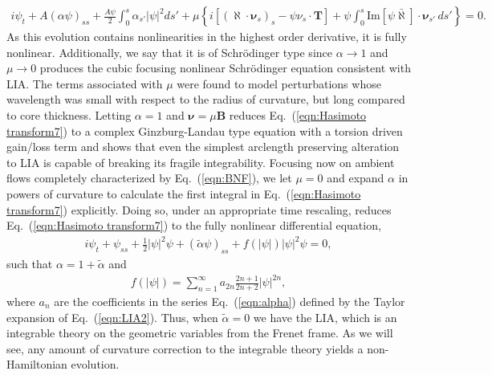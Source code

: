 \documentclass[aps,graphicx,reprint,onecolumn,12pt,tightenlines,longbibliography]{revtex4-1}
\newcommand{\sas}[2]{{#2}}
\begin{document}
%
\begin{align}
\label{eqn:Hasimoto transform7} i\psi_{t} + A(\alpha \psi)_{ss} +  \frac{A\psi}{2} \int_{0}^{s} \alpha_{s'}|\psi|^{2} ds'  + \mu \left\{ i[(\bm{\aleph}\cdot \bm{\nu}_{s})_{s}-\psi\nu_{s}\cdot {\textbf{T}}] +\psi \int_{0}^{s} \mbox{Im}[\psi \bar{\bm{\aleph}}] \cdot \bm{\nu}_{s'}\,ds'\right\}=0.
\end{align}
%
\sas{which is a fully nonlinear integro-differential equation of Schr\"odinger type.}{As this evolution contains nonlinearities in the highest order derivative, it is fully nonlinear. Additionally, we say that it is of Schr\"odinger type since $\alpha\to 1$ and $\mu \to 0$ produces the cubic focusing nonlinear Schr\"odinger equation consistent with LIA.} The terms associated with $\mu$ were found to model perturbations whose  wavelength was small with respect to the radius of curvature, but long compared to core thickness. Letting $\alpha=1$ and $\bm{\nu}=\mu \textbf{B}$ reduces Eq.~(\ref{eqn:Hasimoto transform7}) to a complex Ginzburg-Landau type equation with a torsion driven gain/loss term and shows that even the simplest arclength preserving alteration to LIA is capable of breaking its fragile integrability. Focusing now on ambient flows completely characterized by Eq.~(\ref{eqn:BNF}), we let $\mu=0$ and expand $\alpha$ in powers of curvature to calculate the first integral in Eq.~(\ref{eqn:Hasimoto transform7}) explicitly. Doing so, under an appropriate time rescaling, reduces Eq.~(\ref{eqn:Hasimoto transform7}) to the fully nonlinear differential equation,
%
\begin{align}\label{eqn:Hasimoto transform8}
i\psi_{t}+\psi_{ss} + \frac{1}{2} |\psi|^{2} \psi + \left(\tilde{\alpha} \psi\right)_{ss} + f(|\psi|)|\psi|^{2}\psi =0,
\end{align}
%
such that $\alpha = 1 + \tilde{\alpha}$ and 
%
\begin{align}\label{eqn:Hasimoto transform8aux1}
f(|\psi|) = \sum_{n=1}^{\infty} a_{2n} \frac{2n+1}{2n+2} |\psi|^{2n},
\end{align}
%
where $a_{n}$ are the coefficients in the \sas{continued expansion}{series} \sas{of}{ Eq.~(\ref{eqn:alpha}) defined by the Taylor expansion of Eq.~(\ref{eqn:LIA2})}. Thus, when $\tilde{\alpha}=0$ we have the LIA, which is an integrable theory on the geometric variables from the Frenet frame. As we will see, any amount of curvature correction to the integrable theory yields a non-Hamiltonian evolution. 
\end{document}
